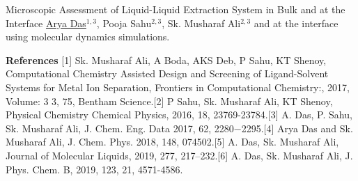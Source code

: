 \begin{abstract_online}{Microscopic Assessment of Liquid-Liquid Extraction System in Bulk and at the Interface}{%
        \underline{Arya Das}$^{1, 3}$, Pooja Sahu$^{2, 3}$, Sk. Musharaf Ali$^{2, 3}$}{%
        \IStag}
and at the interface using molecular dynamics simulations. 
    
        \textbf{References} \newline{}[1] Sk. Musharaf Ali, A Boda, AKS Deb, P Sahu, KT Shenoy, Computational Chemistry Assisted Design and Screening of Ligand-Solvent Systems for Metal Ion Separation, Frontiers in Computational Chemistry:, 2017, Volume: 3 3, 75, Bentham Science.\newline{}[2] P Sahu, Sk. Musharaf Ali, KT Shenoy, Physical Chemistry Chemical Physics, 2016, 18, 23769-23784.\newline{}[3] A. Das, P. Sahu, Sk. Musharaf Ali, J. Chem. Eng. Data 2017, 62, 2280−2295.\newline{}[4] Arya Das and Sk. Musharaf Ali,    J. Chem. Phys. 2018, 148, 074502.\newline{}[5] A. Das, Sk. Musharaf Ali, Journal of Molecular Liquids, 2019, 277, 217–232.\newline{}[6] A. Das, Sk. Musharaf Ali, J. Phys. Chem. B, 2019, 123, 21, 4571-4586.
    \end{abstract_online}
    
